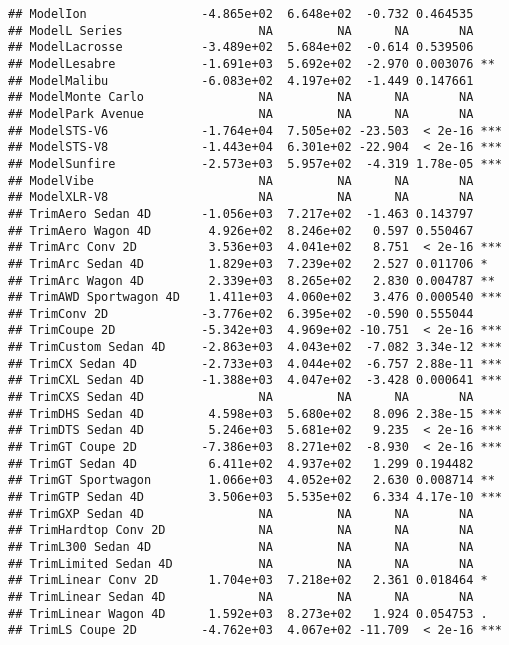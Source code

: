 \documentclass[
]{article}
\begin{document}
\begin{verbatim}
## ModelIon                -4.865e+02  6.648e+02  -0.732 0.464535    
## ModelL Series                   NA         NA      NA       NA    
## ModelLacrosse           -3.489e+02  5.684e+02  -0.614 0.539506    
## ModelLesabre            -1.691e+03  5.692e+02  -2.970 0.003076 ** 
## ModelMalibu             -6.083e+02  4.197e+02  -1.449 0.147661    
## ModelMonte Carlo                NA         NA      NA       NA    
## ModelPark Avenue                NA         NA      NA       NA    
## ModelSTS-V6             -1.764e+04  7.505e+02 -23.503  < 2e-16 ***
## ModelSTS-V8             -1.443e+04  6.301e+02 -22.904  < 2e-16 ***
## ModelSunfire            -2.573e+03  5.957e+02  -4.319 1.78e-05 ***
## ModelVibe                       NA         NA      NA       NA    
## ModelXLR-V8                     NA         NA      NA       NA    
## TrimAero Sedan 4D       -1.056e+03  7.217e+02  -1.463 0.143797    
## TrimAero Wagon 4D        4.926e+02  8.246e+02   0.597 0.550467    
## TrimArc Conv 2D          3.536e+03  4.041e+02   8.751  < 2e-16 ***
## TrimArc Sedan 4D         1.829e+03  7.239e+02   2.527 0.011706 *  
## TrimArc Wagon 4D         2.339e+03  8.265e+02   2.830 0.004787 ** 
## TrimAWD Sportwagon 4D    1.411e+03  4.060e+02   3.476 0.000540 ***
## TrimConv 2D             -3.776e+02  6.395e+02  -0.590 0.555044    
## TrimCoupe 2D            -5.342e+03  4.969e+02 -10.751  < 2e-16 ***
## TrimCustom Sedan 4D     -2.863e+03  4.043e+02  -7.082 3.34e-12 ***
## TrimCX Sedan 4D         -2.733e+03  4.044e+02  -6.757 2.88e-11 ***
## TrimCXL Sedan 4D        -1.388e+03  4.047e+02  -3.428 0.000641 ***
## TrimCXS Sedan 4D                NA         NA      NA       NA    
## TrimDHS Sedan 4D         4.598e+03  5.680e+02   8.096 2.38e-15 ***
## TrimDTS Sedan 4D         5.246e+03  5.681e+02   9.235  < 2e-16 ***
## TrimGT Coupe 2D         -7.386e+03  8.271e+02  -8.930  < 2e-16 ***
## TrimGT Sedan 4D          6.411e+02  4.937e+02   1.299 0.194482    
## TrimGT Sportwagon        1.066e+03  4.052e+02   2.630 0.008714 ** 
## TrimGTP Sedan 4D         3.506e+03  5.535e+02   6.334 4.17e-10 ***
## TrimGXP Sedan 4D                NA         NA      NA       NA    
## TrimHardtop Conv 2D             NA         NA      NA       NA    
## TrimL300 Sedan 4D               NA         NA      NA       NA    
## TrimLimited Sedan 4D            NA         NA      NA       NA    
## TrimLinear Conv 2D       1.704e+03  7.218e+02   2.361 0.018464 *  
## TrimLinear Sedan 4D             NA         NA      NA       NA    
## TrimLinear Wagon 4D      1.592e+03  8.273e+02   1.924 0.054753 .  
## TrimLS Coupe 2D         -4.762e+03  4.067e+02 -11.709  < 2e-16 ***

\end{verbatim}
\end{document}
